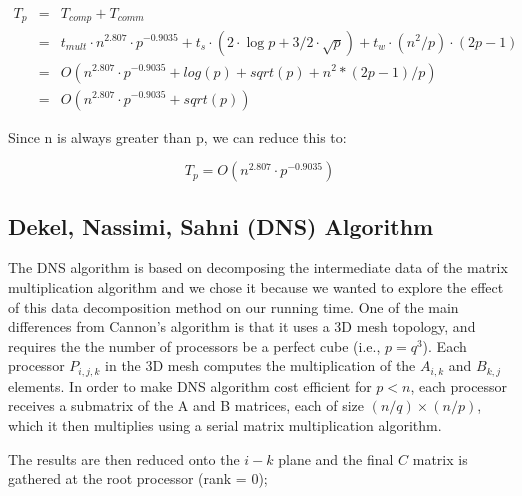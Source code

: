 \documentclass{article}
\begin{document}
\begin{eqnarray*}
T_p &=& T_{{comp}} + T_{{comm}} \\
&=& t_{{mult}} \cdot n^{2.807} \cdot  p^{-0.9035} +  t_s \cdot (2 \cdot \log{p} + 3/2 \cdot \sqrt{p}) + t_w \cdot (n^2/p) \cdot (2p-1) \\
&=& O(n^{2.807} \cdot  p^{-0.9035} + log(p) + sqrt(p) + n^2*(2p-1)/p) \\
&=& O(n^{2.807} \cdot  p^{-0.9035} + sqrt(p))
\end{eqnarray*}

Since n is always greater than p, we can reduce this to:

$$	T_p = O(n^{2.807} \cdot  p^{-0.9035})$$




\subsection{Dekel, Nassimi, Sahni (DNS) Algorithm}

The DNS algorithm is based on decomposing the intermediate data of the matrix
multiplication algorithm and we chose it because we wanted to explore the effect
of this data decomposition method on our running time. One of the main
differences from Cannon's algorithm is that it uses a 3D mesh topology, and
requires the the number of processors be a perfect cube (i.e., $p = q^3$). Each
processor $P_{i,j,k}$ in the 3D mesh computes the multiplication of the
$A_{i,k}$ and $B_{k,j}$ elements.  In order to make DNS algorithm cost efficient
for $p < n$, each processor receives a submatrix of the A and B matrices, each
of size $(n/q) \times (n/p)$, which it then multiplies using a serial matrix
multiplication algorithm.

The results are then reduced onto the $i-k$ plane and the final $C$ matrix is
gathered at the root processor (rank = 0);
\end{document}
